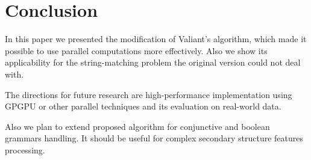 \section{\bf Conclusion}

In this paper we presented the modification of Valiant's algorithm, which made it possible to use parallel computations more effectively. Also we show its applicability for the string-matching problem the original version could not deal with.

The directions for future research are high-performance implementation using GPGPU or other parallel techniques and its evaluation on real-world data.

Also we plan to extend proposed algorithm for conjunctive and boolean grammars handling. It should be useful for complex secondary structure features processing.
